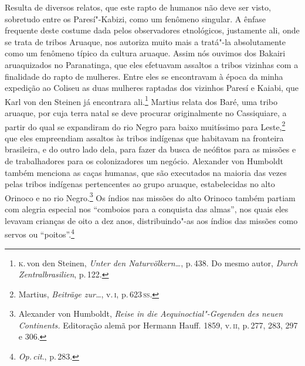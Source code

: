 Resulta de diversos relatos, que este rapto de humanos não deve ser
visto, sobretudo entre os Paresí"-Kabizi, como um fenômeno singular. A
ênfase frequente deste costume dada pelos observadores etnológicos,
justamente ali, onde se trata de tribos Aruaque, nos autoriza muito mais
a tratá"-la absolutamente como um fenômeno típico da cultura aruaque.
Assim nós ouvimos dos Bakairi aruaquizados no Paranatinga, que eles
efetuavam assaltos a tribos vizinhas com a finalidade do rapto de
mulheres. Entre eles se encontravam à época da minha expedição ao
Coliseu as duas mulheres raptadas dos vizinhos Paresí e Kaiabi, que Karl
von den Steinen já encontrara ali.\footnote{\textsc{k}.\,von den Steinen,
  \textit{Unter den Naturvölkern\ldots}, p.\,438. Do mesmo
  autor, \textit{Durch Zentralbrasilien}, p.\,122.} Martius relata dos
Baré, uma tribo aruaque, por cuja terra natal se deve procurar
originalmente no Cassiquiare, a partir do qual se expandiram do rio
Negro para baixo muitíssimo para Leste,\footnote{Martius, \textit{Beiträge
  zur\ldots}, v.\,\textsc{i},
  p.\,623\,\textsc{ss}.} que eles empreendiam assaltos às tribos indígenas que
habitavam na fronteira brasileira, e do outro lado dela, para fazer da
busca de neófitos para as missões e de trabalhadores para os
colonizadores um negócio. Alexander von Humboldt também menciona as
caças humanas, que são executados na maioria das vezes pelas tribos
indígenas pertencentes ao grupo aruaque, estabelecidas no alto Orinoco e
no rio Negro.\footnote{Alexander von Humboldt, \textit{Reise in die
  Aequinoctial"-Gegenden des neuen Continents.} Editoração alemã por
  Hermann Hauff. 1859, v.\,\textsc{ii}, p.\,277, 283, 297 e 306.} Os índios nas
missões do alto Orinoco também partiam com alegria especial nos
``comboios para a conquista das almas'', nos quais eles levavam
crianças de oito a dez anos, distribuindo"-as aos índios das missões como
servos ou ``poitos''.\footnote{\textit{Op.\,cit}., p.\,283.}


